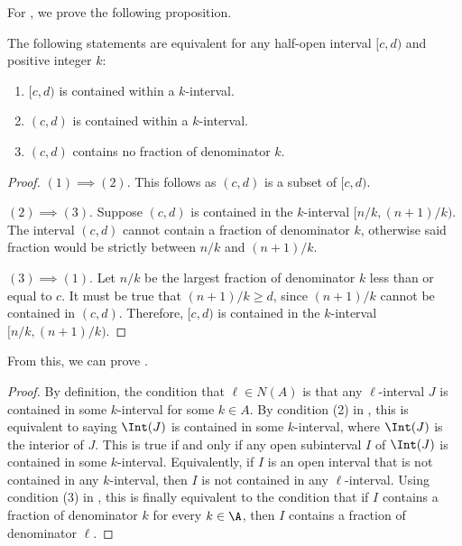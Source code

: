 \documentclass{toc}
\begin{document}
For ,  we prove the following proposition.
\begin{proposition}
    \label{prop:intervalcondition-1}
    The following statements are equivalent for any half-open interval $[c,d)$ and positive integer $k$:
    \begin{enumerate}[(1)]
        \item $[c,d)$ is contained within a $k$-interval.
        \item $(c,d)$ is contained within a $k$-interval.
        \item $(c,d)$ contains no fraction of denominator $k$.
    \end{enumerate}
\end{proposition}

\begin{proof} $(1) \implies (2)$. This follows as $(c,d)$ is a subset of $[c,d)$.
        
        $(2) \implies (3)$. Suppose $(c,d)$ is contained in the $k$-interval $[n/k, (n+1)/k)$. The interval $(c,d)$ cannot contain a fraction of denominator $k$, otherwise said fraction would be strictly between $n/k$ and $(n+1)/k$.
        
        $(3) \implies (1)$. Let $n/k$ be the largest fraction of denominator $k$ less than or equal to $c$. It must be true that $(n+1)/k\ge d$, since $(n+1)/k$ cannot be contained in $(c,d)$. Therefore, $[c,d)$ is contained in the $k$-interval $[n/k, (n+1)/k)$.
\end{proof}

From this, we can prove . 

\begin{proof}
    By definition, the condition that $\ell\in N(A)$ is that any $\ell$-interval $J$ is contained in some $k$-interval for some $k\in A$. By condition (2) in , this is equivalent to saying $\Int(J)$ is contained in some $k$-interval, where $\Int(J)$ is the interior of $J$. This is true if and only if any open subinterval $I$ of $\Int(J)$ is contained in some $k$-interval. Equivalently, if $I$ is an open interval that is not contained in any $k$-interval, then $I$ is not contained in any $\ell$-interval. Using condition (3) in , this is finally equivalent to the condition that if $I$ contains a fraction of denominator $k$ for every $k\in \A$, then $I$ contains a fraction of denominator $\ell$.
\end{proof}
\end{document}
